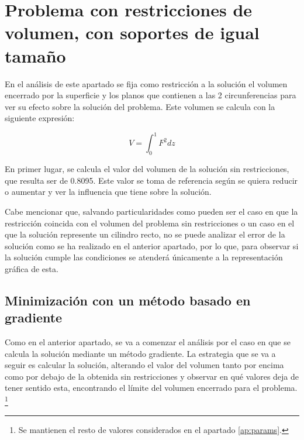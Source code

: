 \section{Problema con restricciones de volumen, con soportes de igual tamaño}

En el análisis de este apartado se fija como restricción a la solución el volumen encerrado por la superficie y los planos que contienen a las 2 circunferencias para ver su efecto sobre la solución del problema. Este volumen se calcula con la siguiente expresión:

\begin{equation}
    V = \int_0^1 F^2 dz
\end{equation}

En primer lugar, se calcula el valor del volumen de la solución sin restricciones, que resulta ser de 0.8095. Este valor se toma de referencia según se quiera reducir o aumentar y ver la influencia que tiene sobre la solución. 

Cabe mencionar que, salvando particularidades como pueden ser el caso en que la restricción coincida con el volumen del problema sin restricciones o un caso en el que la solución represente un cilindro recto, no se puede analizar el error de la solución como se ha realizado en el anterior apartado, por lo que, para observar si la solución cumple las condiciones se atenderá únicamente a la representación gráfica de esta.

\subsection{Minimización con un método basado en gradiente} \label{ap:cons_grad}

Como en el anterior apartado, se va a comenzar el análisis por el caso en que se calcula la solución mediante un método gradiente. La estrategia que se va a seguir es calcular la solución, alterando el valor del volumen tanto por encima como por debajo de la obtenida sin restricciones y observar en qué valores deja de tener sentido esta, encontrando el límite del volumen encerrado para el problema. \footnote{Se mantienen el resto de valores considerados en el apartado \ref{ap:params}.}

